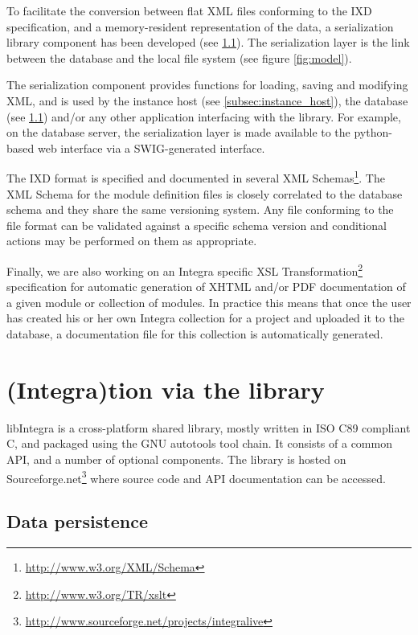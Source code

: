 To facilitate the conversion between flat XML files conforming to the IXD specification, and a memory-resident representation of the data, a serialization library component has been developed (see \ref{subsec:serialization}). The serialization layer is the link  between the database and the local file system (see figure \ref{fig:model}).

The serialization component provides functions for loading, saving and modifying XML, and is used by the instance host (see \ref{subsec:instance_host}), the database (see \ref{subsec:serialization}) and/or any other application interfacing with the library. For example, on the database server, the serialization layer is made available to the python-based web interface via a SWIG-generated interface.

The IXD format is specified and documented in several XML Schemas\footnote{\url{http://www.w3.org/XML/Schema}}. The XML Schema for the module definition files is closely correlated to the database schema and they share the same versioning system. Any file conforming to the file format can be validated against a specific schema version and conditional actions may be performed on them as appropriate.

Finally, we are also working on an Integra specific XSL Transformation\footnote{\url{http://www.w3.org/TR/xslt}} specification for automatic generation of XHTML and/or PDF documentation of a given module or collection of modules. In practice this means that once the user has created his or her own Integra collection for a project and uploaded it to the database, a documentation file for this collection is automatically generated.


\section{(Integra)tion via the library}\label{subsec:db_lib}

libIntegra is a cross-platform shared library, mostly written in ISO C89 compliant C, and packaged using the GNU autotools tool chain. It consists of a common API, and a number of optional components. The library is hosted on Sourceforge.net\footnote{\url{http://www.sourceforge.net/projects/integralive}} where source code and API documentation can be accessed.

\subsection{Data persistence}\label{subsec:serialization}

